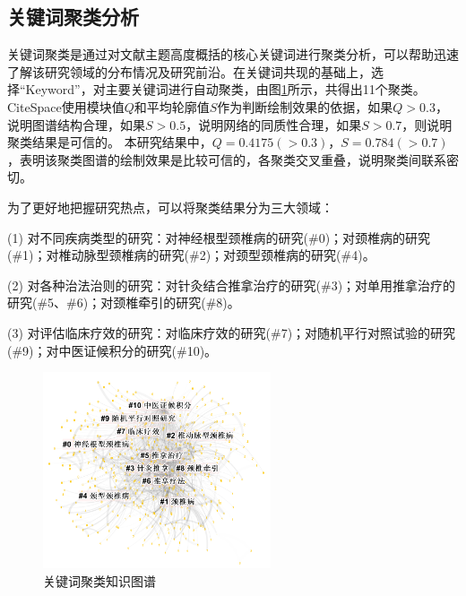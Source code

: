 \documentclass[lang=cn,11pt,a4paper,cite=super,AutoFakeBold,chinesefont=founder]{elegantpaper}
\begin{document}
\subsection{关键词聚类分析} %

关键词聚类是通过对文献主题高度概括的核心关键词进行聚类分析，可以帮助迅速了解该研究领域的分布情况及研究前沿。在关键词共现的基础上，选择“Keyword”，对主要关键词进行自动聚类，由图\ref{figure:4}所示，共得出11个聚类。CiteSpace使用模块值$Q$和平均轮廓值$S$作为判断绘制效果的依据，如果$Q>0.3$，说明图谱结构合理，如果$S>0.5$，说明网络的同质性合理，如果$S>0.7$，则说明聚类结果是可信的。%
本研究结果中，$Q=0.4175(>0.3)$，$S=0.784(>0.7)$，表明该聚类图谱的绘制效果是比较可信的，各聚类交叉重叠，说明聚类间联系密切。

为了更好地把握研究热点，可以将聚类结果分为三大领域：

(1) 对不同疾病类型的研究：对神经根型颈椎病的研究(\#0)；对颈椎病的研究(\#1)；对椎动脉型颈椎病的研究(\#2)；对颈型颈椎病的研究(\#4)。

(2) 对各种治法治则的研究：对针灸结合推拿治疗的研究(\#3)；对单用推拿治疗的研究(\#5、\#6)；对颈椎牵引的研究(\#8)。

(3) 对评估临床疗效的研究：对临床疗效的研究(\#7)；对随机平行对照试验的研究(\#9)；对中医证候积分的研究(\#10)。



\begin{figure}[!ht]
  \centering
  \includegraphics[width=0.6\textwidth]{figure/关键词聚类.png}
  \caption{关键词聚类知识图谱}
  \label{figure:4}
\end{figure}
\end{document}
